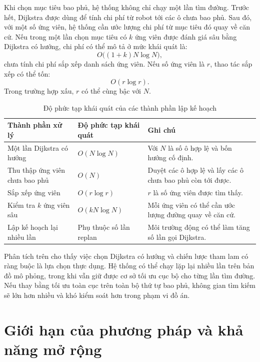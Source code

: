 \documentclass[../DoAn.tex]{subfiles}
\begin{document}
Khi chọn mục tiêu bao phủ, hệ thống không chỉ chạy một lần tìm đường. Trước hết, Dijkstra được dùng để tính chi phí từ robot tới các ô chưa bao phủ. Sau đó, với một số ứng viên, hệ thống cần ước lượng chi phí từ mục tiêu đó quay về căn cứ. Nếu trong một lần chọn mục tiêu có $k$ ứng viên được đánh giá sâu bằng Dijkstra có hướng, chi phí có thể mô tả ở mức khái quát là:
\begin{equation}
O\bigl((1+k)N\log N\bigr),
\end{equation}
chưa tính chi phí sắp xếp danh sách ứng viên. Nếu số ứng viên là $r$, thao tác sắp xếp có thể tốn:
\begin{equation}
O(r\log r).
\end{equation}
Trong trường hợp xấu, $r$ có thể cùng bậc với $N$.

\begin{table}[!htbp]
\centering
\caption{Độ phức tạp khái quát của các thành phần lập kế hoạch}
\small
\setlength{\tabcolsep}{4pt}
\renewcommand{\arraystretch}{1.05}
\begin{tabular}{|L{0.34\textwidth}|L{0.24\textwidth}|L{0.32\textwidth}|}
\hline
\textbf{Thành phần xử lý} & \textbf{Độ phức tạp khái quát} & \textbf{Ghi chú} \\
\hline
Một lần Dijkstra có hướng & $O(N\log N)$ & Với $N$ là số ô hợp lệ và bốn hướng cố định. \\
\hline
Thu thập ứng viên chưa bao phủ & $O(N)$ & Duyệt các ô hợp lệ và lấy các ô chưa bao phủ còn tới được. \\
\hline
Sắp xếp ứng viên & $O(r\log r)$ & $r$ là số ứng viên được tìm thấy. \\
\hline
Kiểm tra $k$ ứng viên sâu & $O(kN\log N)$ & Mỗi ứng viên có thể cần ước lượng đường quay về căn cứ. \\
\hline
Lập kế hoạch lại nhiều lần & Phụ thuộc số lần replan & Môi trường động có thể làm tăng số lần gọi Dijkstra. \\
\hline
\end{tabular}\end{table}

Phân tích trên cho thấy việc chọn Dijkstra có hướng và chiến lược tham lam có ràng buộc là lựa chọn thực dụng. Hệ thống có thể chạy lặp lại nhiều lần trên bản đồ mô phỏng, trong khi vẫn giữ được cơ sở tối ưu cục bộ cho từng lần tìm đường. Nếu thay bằng tối ưu toàn cục trên toàn bộ thứ tự bao phủ, không gian tìm kiếm sẽ lớn hơn nhiều và khó kiểm soát hơn trong phạm vi đồ án.

\section{Giới hạn của phương pháp và khả năng mở rộng}
\end{document}
